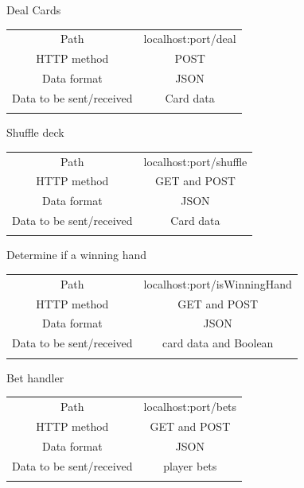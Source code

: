 \documentclass[12pt, a4paper]{article}
\begin{document}
\begin{center}
Deal Cards
\begin{tabular}{ c || c  }
 Path & localhost:port/deal  \\ 
 HTTP method &  POST \\  
 Data format &  JSON    \\
Data to be sent/received & Card data \\ \\
\end{tabular}
\end{center}

\begin{center}
Shuffle deck
\begin{tabular}{ c || c  }
 Path & localhost:port/shuffle  \\ 
 HTTP method &  GET and POST \\  
 Data format &  JSON    \\
Data to be sent/received & Card data \\ \\
\end{tabular}
\end{center}

\begin{center}
Determine if a winning hand
\begin{tabular}{ c || c  }
 Path & localhost:port/isWinningHand  \\ 
 HTTP method &  GET and POST \\  
 Data format &  JSON    \\
Data to be sent/received & card data and Boolean \\ \\
\end{tabular}
\end{center}

\begin{center}
Bet handler
\begin{tabular}{ c || c  }
 Path & localhost:port/bets  \\ 
 HTTP method &  GET and POST \\  
 Data format &  JSON    \\
Data to be sent/received & player bets \\ \\
\end{tabular}
\end{center}
\end{document}

